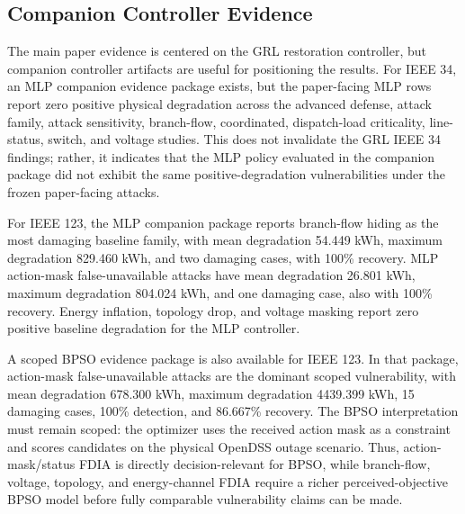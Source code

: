 \subsection{Companion Controller Evidence}
\label{subsec:companion_controller_evidence}

The main paper evidence is centered on the GRL restoration controller, but companion controller artifacts are useful for positioning the results. For IEEE 34, an MLP companion evidence package exists, but the paper-facing MLP rows report zero positive physical degradation across the advanced defense, attack family, attack sensitivity, branch-flow, coordinated, dispatch-load criticality, line-status, switch, and voltage studies. This does not invalidate the GRL IEEE 34 findings; rather, it indicates that the MLP policy evaluated in the companion package did not exhibit the same positive-degradation vulnerabilities under the frozen paper-facing attacks.

For IEEE 123, the MLP companion package reports branch-flow hiding as the most damaging baseline family, with mean degradation 54.449 kWh, maximum degradation 829.460 kWh, and two damaging cases, with 100\% recovery. MLP action-mask false-unavailable attacks have mean degradation 26.801 kWh, maximum degradation 804.024 kWh, and one damaging case, also with 100\% recovery. Energy inflation, topology drop, and voltage masking report zero positive baseline degradation for the MLP controller.

A scoped BPSO evidence package is also available for IEEE 123. In that package, action-mask false-unavailable attacks are the dominant scoped vulnerability, with mean degradation 678.300 kWh, maximum degradation 4439.399 kWh, 15 damaging cases, 100\% detection, and 86.667\% recovery. The BPSO interpretation must remain scoped: the optimizer uses the received action mask as a constraint and scores candidates on the physical OpenDSS outage scenario. Thus, action-mask/status FDIA is directly decision-relevant for BPSO, while branch-flow, voltage, topology, and energy-channel FDIA require a richer perceived-objective BPSO model before fully comparable vulnerability claims can be made.


